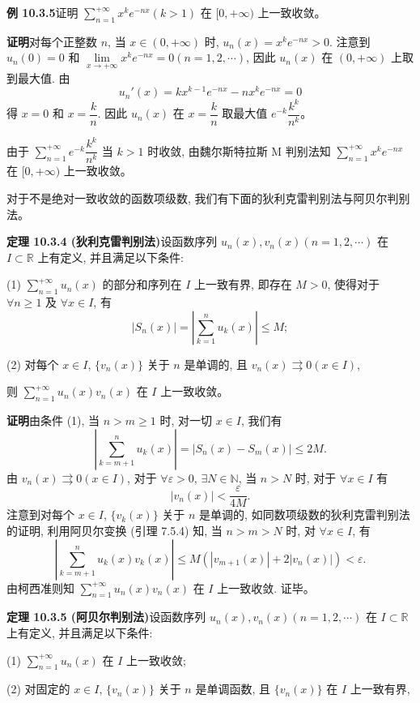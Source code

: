 \documentclass[UTF8,12pt,a4paper,fontset=fandol]{ctexart}
\begin{document}
\noindent\textbf{例 10.3.5}\quad 证明 $\sum\limits_{n=1}^{+\infty}x^ke^{-nx}(k>1)$ 在 $[0,+\infty)$ 上一致收敛。

\noindent\textbf{证明}\quad 对每个正整数 $n$, 当 $x\in(0,+\infty)$ 时, $u_n(x)=x^ke^{-nx}>0$. 注意到 $u_n(0)=0$ 和 $\lim\limits_{x\to+\infty}x^ke^{-nx}=0(n=1,2,\cdots)$, 因此 $u_n(x)$ 在 $(0,+\infty)$ 上取到最大值. 由
\[
  u_n'(x)=kx^{k-1}e^{-nx}-nx^ke^{-nx}=0
\]
得 $x=0$ 和 $x=\dfrac{k}{n}$. 因此 $u_n(x)$ 在 $x=\dfrac{k}{n}$ 取最大值 $e^{-k}\dfrac{k^k}{n^k}$。

由于 $\sum\limits_{n=1}^{+\infty}e^{-k}\dfrac{k^k}{n^k}$ 当 $k>1$ 时收敛, 由魏尔斯特拉斯 M 判别法知 $\sum\limits_{n=1}^{+\infty}x^ke^{-nx}$ 在 $[0,+\infty)$ 上一致收敛。

对于不是绝对一致收敛的函数项级数, 我们有下面的狄利克雷判别法与阿贝尔判别法。

\noindent\textbf{定理 10.3.4 (狄利克雷判别法)}\quad 设函数序列 $u_n(x),v_n(x)(n=1,2,\cdots)$ 在 $I\subset\mathbb R$ 上有定义, 并且满足以下条件:

(1) $\sum\limits_{n=1}^{+\infty}u_n(x)$ 的部分和序列在 $I$ 上一致有界, 即存在 $M>0$, 使得对于 $\forall n\geq1$ 及 $\forall x\in I$, 有
\[
  |S_n(x)|=\left|\sum_{k=1}^n u_k(x)\right|\leq M;
\]

(2) 对每个 $x\in I$, $\{v_n(x)\}$ 关于 $n$ 是单调的, 且 $v_n(x)\rightrightarrows0(x\in I)$,

则 $\sum\limits_{n=1}^{+\infty}u_n(x)v_n(x)$ 在 $I$ 上一致收敛。

\noindent\textbf{证明}\quad 由条件 (1), 当 $n>m\geq1$ 时, 对一切 $x\in I$, 我们有
\[
  \left|\sum_{k=m+1}^n u_k(x)\right|=|S_n(x)-S_m(x)|\leq2M.
\]
由 $v_n(x)\rightrightarrows0(x\in I)$, 对于 $\forall\varepsilon>0$, $\exists N\in\mathbb N$, 当 $n>N$ 时, 对于 $\forall x\in I$ 有
\[
  |v_n(x)|<\frac{\varepsilon}{4M}.
\]
注意到对每个 $x\in I$, $\{v_k(x)\}$ 关于 $n$ 是单调的, 如同数项级数的狄利克雷判别法的证明, 利用阿贝尔变换 (引理 7.5.4) 知, 当 $n>m>N$ 时, 对 $\forall x\in I$, 有
\[
  \left|\sum_{k=m+1}^n u_k(x)v_k(x)\right|
  \leq M(|v_{m+1}(x)|+2|v_n(x)|)<\varepsilon.
\]
由柯西准则知 $\sum\limits_{n=1}^{+\infty}u_n(x)v_n(x)$ 在 $I$ 上一致收敛. 证毕。

\noindent\textbf{定理 10.3.5 (阿贝尔判别法)}\quad 设函数序列 $u_n(x),v_n(x)(n=1,2,\cdots)$ 在 $I\subset\mathbb R$ 上有定义, 并且满足以下条件:

(1) $\sum\limits_{n=1}^{+\infty}u_n(x)$ 在 $I$ 上一致收敛;

(2) 对固定的 $x\in I$, $\{v_n(x)\}$ 关于 $n$ 是单调函数, 且 $\{v_n(x)\}$ 在 $I$ 上一致有界,
\end{document}
